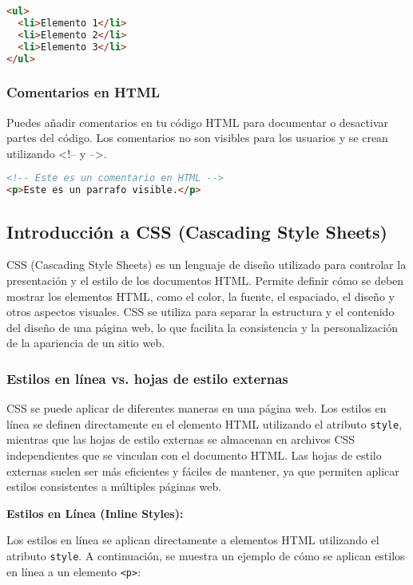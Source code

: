 \documentclass[executivepaper]{article}
\begin{document}
\begin{lstlisting}[language=HTML]
<ul>
  <li>Elemento 1</li>
  <li>Elemento 2</li>
  <li>Elemento 3</li>
</ul>
\end{lstlisting}

\subsubsection*{Comentarios en HTML}
Puedes añadir comentarios en tu código HTML para documentar o desactivar partes del código. Los comentarios no son visibles para los usuarios y se crean utilizando <!-- y -->.

\begin{lstlisting}[language=HTML]
<!-- Este es un comentario en HTML -->
<p>Este es un parrafo visible.</p>
\end{lstlisting}


\subsection{Introducción a CSS (Cascading Style Sheets)}

CSS (Cascading Style Sheets) es un lenguaje de diseño utilizado para controlar la presentación y el estilo de los documentos HTML. Permite definir cómo se deben mostrar los elementos HTML, como el color, la fuente, el espaciado, el diseño y otros aspectos visuales. CSS se utiliza para separar la estructura y el contenido del diseño de una página web, lo que facilita la consistencia y la personalización de la apariencia de un sitio web.

\subsubsection*{Estilos en línea vs. hojas de estilo externas}

CSS se puede aplicar de diferentes maneras en una página web. Los estilos en línea se definen directamente en el elemento HTML utilizando el atributo \texttt{style}, mientras que las hojas de estilo externas se almacenan en archivos CSS independientes que se vinculan con el documento HTML. Las hojas de estilo externas suelen ser más eficientes y fáciles de mantener, ya que permiten aplicar estilos consistentes a múltiples páginas web.

\textbf{Estilos en Línea (Inline Styles):}

Los estilos en línea se aplican directamente a elementos HTML utilizando el atributo \texttt{style}. A continuación, se muestra un ejemplo de cómo se aplican estilos en línea a un elemento \texttt{<p>}:
\end{document}
